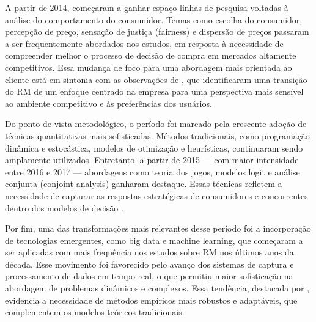 A partir de 2014, começaram a ganhar espaço linhas de pesquisa voltadas à análise do comportamento do consumidor. Temas como escolha do consumidor, percepção de preço, sensação de justiça (fairness) e dispersão de preços passaram a ser frequentemente abordados nos estudos, em resposta à necessidade de compreender melhor o processo de decisão de compra em mercados altamente competitivos. Essa mudança de foco para uma abordagem mais orientada ao cliente está em sintonia com as observações de \citep{Noone2011}, que identificaram uma transição do RM de um enfoque centrado na empresa para uma perspectiva mais sensível ao ambiente competitivo e às preferências dos usuários.

Do ponto de vista metodológico, o período foi marcado pela crescente adoção de técnicas quantitativas mais sofisticadas. Métodos tradicionais, como programação dinâmica e estocástica, modelos de otimização e heurísticas, continuaram sendo amplamente utilizados. Entretanto, a partir de 2015 — com maior intensidade entre 2016 e 2017 — abordagens como teoria dos jogos, modelos logit e análise conjunta (conjoint analysis) ganharam destaque. Essas técnicas refletem a necessidade de capturar as respostas estratégicas de consumidores e concorrentes dentro dos modelos de decisão \citep{Mulyani2021TheFH, Shen2007,STRAUSS2018375}.

Por fim, uma das transformações mais relevantes desse período foi a incorporação de tecnologias emergentes, como big data e machine learning, que começaram a ser aplicadas com mais frequência nos estudos sobre RM nos últimos anos da década. Esse movimento foi favorecido pelo avanço dos sistemas de captura e processamento de dados em tempo real, o que permitiu maior sofisticação na abordagem de problemas dinâmicos e complexos. Essa tendência, destacada por \citep{Gönsch2013}, evidencia a necessidade de métodos empíricos mais robustos e adaptáveis, que complementem os modelos teóricos tradicionais.




